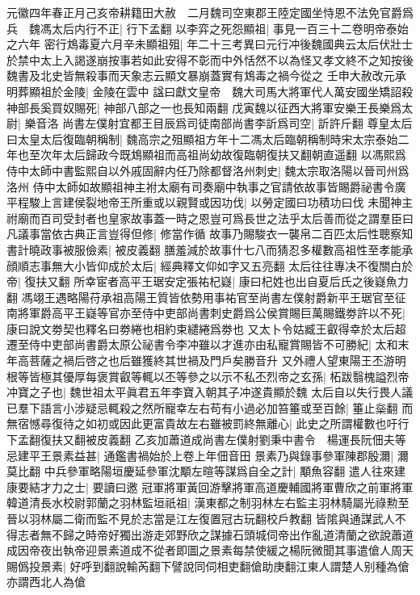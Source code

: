 元徽四年春正月己亥帝耕籍田大赦　二月魏司空東郡王陸定國坐恃恩不法免官爵爲兵　魏馮太后内行不正|{
	行下孟翻}
以李弈之死怨顯祖|{
	事見一百三十二卷明帝泰始之六年}
密行鴆毒夏六月辛未顯祖殂|{
	年二十三考異曰元行冲後魏國典云太后伏壯士於禁中太上入謁遂崩按事若如此安得不彰而中外恬然不以為怪又孝文終不之知按後魏書及北史皆無殺事而天象志云顯文暴崩蓋實有鴆毒之禍今從之}
壬申大赦改元承明葬顯祖於金陵|{
	金陵在雲中}
諡曰獻文皇帝　魏大司馬大將軍代人萬安國坐矯詔殺神部長奚買奴賜死|{
	神部八部之一也長知兩翻}
戊寅魏以征西大將軍安樂王長樂爲太尉|{
	樂音洛}
尚書左僕射宜都王目辰爲司徒南部尚書李訢爲司空|{
	訢許斤翻}
尊皇太后曰太皇太后復臨朝稱制|{
	魏高宗之殂顯祖方年十二馮太后臨朝稱制時宋太宗泰始二年也至次年太后歸政今既鴆顯祖而高祖尚幼故復臨朝復扶又翻朝直遥翻}
以馮熙爲侍中太師中書監熙自以外戚固辭内任乃除都督洛州刺史|{
	魏太宗取洛陽以晉司州爲洛州}
侍中太師如故顯祖神主袝太廟有司奏廟中執事之官請依故事皆賜爵祕書令廣平程駿上言建侯裂地帝王所重或以親賢或因功伐|{
	以勞定國曰功積功曰伐}
未聞神主祔廟而百司受封者也皇家故事蓋一時之恩豈可爲長世之法乎太后善而從之謂羣臣曰凡議事當依古典正言豈得但修|{
	修當作循}
故事乃賜駿衣一襲帛二百匹太后性聰察知書計曉政事被服儉素|{
	被皮義翻}
膳羞減於故事什七八而猜忍多權數高祖性至孝能承顔順志事無大小皆仰成於太后|{
	經典釋文仰如字又五亮翻}
太后往往專决不復關白於帝|{
	復扶又翻}
所幸宦者高平王琚安定張祐杞嶷|{
	康曰杞姓也出自夏后氏之後嶷魚力翻}
馮翊王遇略陽苻承祖高陽王質皆依勢用事祐官至尚書左僕射爵新平王琚官至征南將軍爵高平王嶷等官亦至侍中吏部尚書刺史爵爲公侯賞賜巨萬賜鐵劵許以不死|{
	康曰說文劵契也釋名曰劵綣也相約束繾綣爲劵也}
又太卜令姑臧王叡得幸於太后超遷至侍中吏部尚書爵太原公祕書令李冲雖以才進亦由私寵賞賜皆不可勝紀|{
	太和末年高菩薩之禍后啓之也后雖獲終其世禍及門戶矣勝音升}
又外禮人望東陽王丕游明根等皆極其優厚每褒賞叡等輒以丕等參之以示不私丕烈帝之玄孫|{
	柘跋翳槐謚烈帝}
冲寶之子也|{
	魏世祖太平眞君五年李寶入朝其子冲遂貴顯於魏}
太后自以失行畏人議已羣下語言小涉疑忌輒殺之然所寵幸左右苟有小過必加笞箠或至百餘|{
	箠止橤翻}
而無宿憾尋復待之如初或因此更富貴故左右雖被罰終無離心|{
	此史之所謂權數也吁行下孟翻復扶又翻被皮義翻}
乙亥加蕭道成尚書左僕射劉秉中書令　楊運長阮佃夫等忌建平王景素益甚|{
	通鑑書禍始於上卷上年佃音田}
景素乃與錄事參軍陳郡殷濔|{
	濔莫比翻}
中兵參軍略陽垣慶延參軍沈顒左暄等謀爲自全之計|{
	顒魚容翻}
遣人往來建康要結才力之士|{
	要讀曰邀}
冠軍將軍黃回游擊將軍高道慶輔國將軍曹欣之前軍將軍韓道清長水校尉郭蘭之羽林監垣祇祖|{
	漢東都之制羽林左右監主羽林騎屬光祿勲至晉以羽林屬二衛而監不見於志當是江左復置冠古玩翻校戶教翻}
皆隂與通謀武人不得志者無不歸之時帝好獨出游走郊野欣之謀據石頭城伺帝出作亂道清蘭之欲說蕭道成因帝夜出執帝迎景素道成不從者即圖之景素每禁使緩之楊阮微聞其事遣傖人周天賜僞投景素|{
	好呼到翻說輸芮翻下譬說同伺相吏翻傖助庚翻江東人謂楚人别種為傖亦謂西北人為傖}
